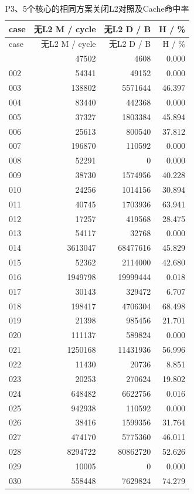 \documentclass[anonymous,notoc]{gmcm2026}
\begin{document}
\begin{longtable}{lrrr}
\caption{P3、5个核心的相同方案关闭L2对照及Cache命中率}\\
\toprule
case & 无L2 M / cycle & 无L2 D / B & H / \%\\\midrule
\endfirsthead
\toprule
case & 无L2 M / cycle & 无L2 D / B & H / \%\\\midrule
\endhead
\bottomrule\endfoot
001 & 47502 & 4608 & 0.000 \\
002 & 54341 & 49152 & 0.000 \\
003 & 138802 & 5571644 & 46.397 \\
004 & 83440 & 442368 & 0.000 \\
005 & 37327 & 1803384 & 45.894 \\
006 & 25613 & 800540 & 37.812 \\
007 & 196870 & 110592 & 0.000 \\
008 & 52291 & 0 & 0.000 \\
009 & 38730 & 1574956 & 40.228 \\
010 & 24256 & 1014156 & 30.894 \\
011 & 40745 & 1703936 & 63.941 \\
012 & 17257 & 419568 & 28.475 \\
013 & 54117 & 32768 & 0.000 \\
014 & 3613047 & 68477616 & 45.829 \\
015 & 52362 & 2114000 & 42.680 \\
016 & 1949798 & 19999444 & 0.018 \\
017 & 30143 & 329472 & 6.707 \\
018 & 198417 & 4706304 & 68.498 \\
019 & 21398 & 985456 & 21.701 \\
020 & 111137 & 589824 & 0.000 \\
021 & 1250168 & 11431936 & 56.996 \\
022 & 11430 & 20736 & 8.851 \\
023 & 20253 & 270624 & 19.802 \\
024 & 648482 & 6622756 & 0.016 \\
025 & 942938 & 110592 & 0.000 \\
026 & 38416 & 1599356 & 31.764 \\
027 & 474170 & 5775360 & 46.011 \\
028 & 8294722 & 80862720 & 52.626 \\
029 & 10005 & 0 & 0.000 \\
030 & 558448 & 7629824 & 74.279 \\

\end{longtable}
\end{document}
